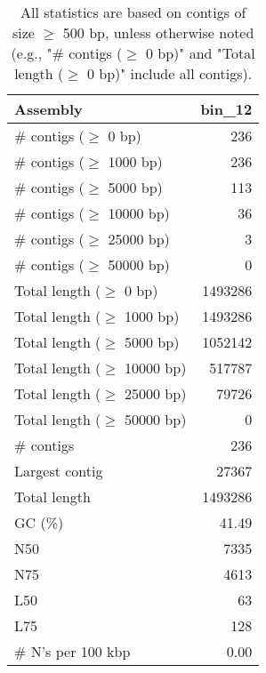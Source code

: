\documentclass[12pt,a4paper]{article}
\begin{document}
\begin{table}[ht]
\begin{center}
\caption{All statistics are based on contigs of size $\geq$ 500 bp, unless otherwise noted (e.g., "\# contigs ($\geq$ 0 bp)" and "Total length ($\geq$ 0 bp)" include all contigs).}
\begin{tabular}{|l*{1}{|r}|}
\hline
Assembly & bin\_12 \\ \hline
\# contigs ($\geq$ 0 bp) & 236 \\ \hline
\# contigs ($\geq$ 1000 bp) & 236 \\ \hline
\# contigs ($\geq$ 5000 bp) & 113 \\ \hline
\# contigs ($\geq$ 10000 bp) & 36 \\ \hline
\# contigs ($\geq$ 25000 bp) & 3 \\ \hline
\# contigs ($\geq$ 50000 bp) & 0 \\ \hline
Total length ($\geq$ 0 bp) & 1493286 \\ \hline
Total length ($\geq$ 1000 bp) & 1493286 \\ \hline
Total length ($\geq$ 5000 bp) & 1052142 \\ \hline
Total length ($\geq$ 10000 bp) & 517787 \\ \hline
Total length ($\geq$ 25000 bp) & 79726 \\ \hline
Total length ($\geq$ 50000 bp) & 0 \\ \hline
\# contigs & 236 \\ \hline
Largest contig & 27367 \\ \hline
Total length & 1493286 \\ \hline
GC (\%) & 41.49 \\ \hline
N50 & 7335 \\ \hline
N75 & 4613 \\ \hline
L50 & 63 \\ \hline
L75 & 128 \\ \hline
\# N's per 100 kbp & 0.00 \\ \hline
\end{tabular}
\end{center}
\end{table}
\end{document}
